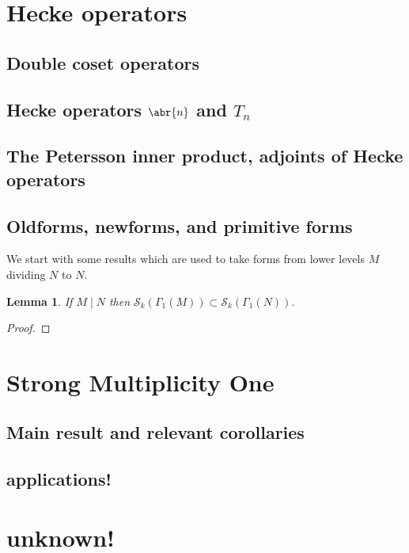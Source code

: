 \documentclass[10pt,leqno,twoside]{article}
\theoremstyle{plain}
\newtheorem{lemma}[lem]{Lemma}
\theoremstyle{definition}
\numberwithin{equation}{section}
\numberwithin{lem}{section}
\newcommand{\textib}[1]{\textbf{\textit{#1\index{#1}}}} %
\newcommand{\tbd}{{\Huge\color{red}{\textib{TBD}}}}
\begin{document}
\newpage\section{Hecke operators}
\subsection{Double coset operators}
\subsection{Hecke operators $\abr{n}$ and $T_n$}
\subsection{The Petersson inner product, adjoints of Hecke operators}
\subsection{Oldforms, newforms, and primitive forms}
We start with some results which are used to take forms from lower levels $M$ dividing $N$ to $N$.
\begin{lemma}
    If $M\mid N$ then $\mathcal S_k(\varGamma_1(M))\subset \mathcal S_k(\varGamma_1(N))$.
\end{lemma}
\begin{proof}
    \tbd
\end{proof}


\newpage\section{Strong Multiplicity One}
\subsection{Main result and relevant corollaries}
\subsection{applications!}

\newpage\section{unknown!}
\end{document}
